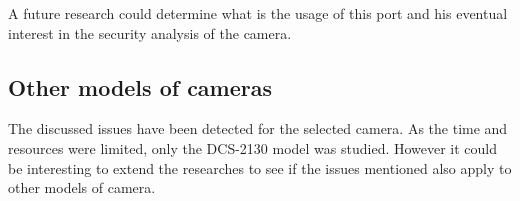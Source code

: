 A future research could determine what is the usage of this port and his eventual interest in the security analysis of the camera.

\subsection{Other models of cameras}

The discussed issues have been detected for the selected camera.
As the time and resources were limited, only the DCS-2130 model was studied.
However it could be interesting to extend the researches to see if the issues mentioned also apply to other models of camera.
